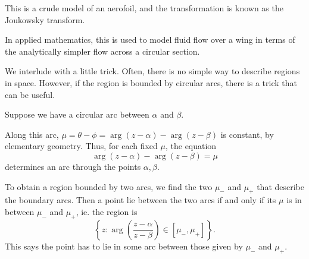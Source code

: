 \documentclass[a4paper]{article}
\begin{document}
\begin{eg}
  This is a crude model of an aerofoil, and the transformation is known as the Joukowsky transform.

  In applied mathematics, this is used to model fluid flow over a wing in terms of the analytically simpler flow across a circular section.
\end{eg}

We interlude with a little trick. Often, there is no simple way to describe regions in space. However, if the region is bounded by circular arcs, there is a trick that can be useful.

Suppose we have a circular arc between $\alpha$ and $\beta$.
\begin{center}
\end{center}
Along this arc, $\mu = \theta - \phi = \arg(z - \alpha) - \arg(z - \beta)$ is constant, by elementary geometry. Thus, for each fixed $\mu$, the equation
\[
  \arg(z - \alpha) - \arg(z - \beta) = \mu
\]
determines an arc through the points $\alpha, \beta$.

To obtain a region bounded by two arcs, we find the two $\mu_-$ and $\mu_+$ that describe the boundary arcs. Then a point lie between the two arcs if and only if its $\mu$ is in between $\mu_-$ and $\mu_+$, ie. the region is
\[
  \left\{z: \arg\left(\frac{z - \alpha}{z - \beta}\right) \in [\mu_-, \mu_+]\right\}.
\]
This says the point has to lie in some arc between those given by $\mu_-$ and $\mu_+$.
\end{document}
